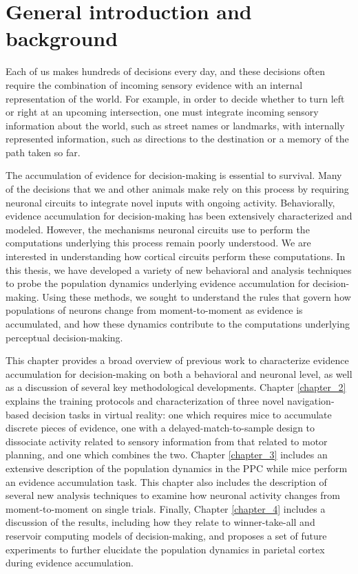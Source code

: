 \chapter{General introduction and background} \label{chapter_1}

Each of us makes hundreds of decisions every day, and these decisions often require the combination of incoming sensory evidence with an internal representation of the world. For example, in order to decide whether to turn left or right at an upcoming intersection, one must integrate incoming sensory information about the world, such as street names or landmarks, with internally represented information, such as directions to the destination or a memory of the path taken so far. 

\bigskip
The accumulation of evidence for decision-making is essential to survival. Many of the decisions that we and other animals make rely on this process by requiring neuronal circuits to integrate novel inputs with ongoing activity. Behaviorally, evidence accumulation for decision-making has been extensively characterized and modeled. However, the mechanisms neuronal circuits use to perform the computations underlying this process remain poorly understood. We are interested in understanding how cortical circuits perform these computations. In this thesis, we have developed a variety of new behavioral and analysis techniques to probe the population dynamics underlying evidence accumulation for decision-making. Using these methods, we sought to understand the rules that govern how populations of neurons change from moment-to-moment as evidence is accumulated, and how these dynamics contribute to the computations underlying perceptual decision-making.

\bigskip
This chapter provides a broad overview of previous work to characterize evidence accumulation for decision-making on both a behavioral and neuronal level, as well as a discussion of several key methodological developments. Chapter \ref{chapter_2} explains the training protocols and characterization of three novel navigation-based decision tasks in virtual reality: one which requires mice to accumulate discrete pieces of evidence, one with a delayed-match-to-sample design to dissociate activity related to sensory information from that related to motor planning, and one which combines the two. Chapter \ref{chapter_3} includes an extensive description of the population dynamics in the PPC while mice perform an evidence accumulation task. This chapter also includes the description of several new analysis techniques to examine how neuronal activity changes from moment-to-moment on single trials. Finally, Chapter \ref{chapter_4} includes a discussion of the results, including how they relate to winner-take-all and reservoir computing models of decision-making, and proposes a set of future experiments to further elucidate the population dynamics in parietal cortex during evidence accumulation. 

